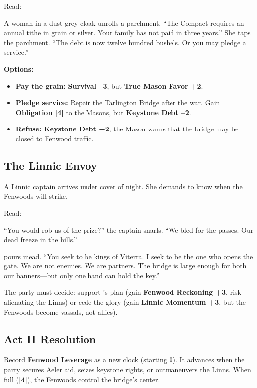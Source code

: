\documentclass[11pt,a5paper]{book}
\newcommand{\clock}[1]{\textbf{[#1]}}
\begin{document}
Read:
\begin{quoting}
A woman in a dust-grey cloak unrolls a parchment. ``The Compact requires an annual tithe in grain or silver. Your family has not paid in three years.'' She taps the parchment. ``The debt is now twelve hundred bushels. Or you may pledge a service.''
\end{quoting}

\textbf{Options:}
\begin{itemize}[leftmargin=*]
\item \textbf{Pay the grain:} \textbf{Survival --3}, but \textbf{True Mason Favor +2}.
\item \textbf{Pledge service:} Repair the Tarlington Bridge after the war. Gain \textbf{Obligation \clock{4}} to the Masons, but \textbf{Keystone Debt --2}.
\item \textbf{Refuse:} \textbf{Keystone Debt +2}; the Mason warns that the bridge may be closed to Fenwood traffic.
\end{itemize}

\subsection*{The Linnic Envoy}

A Linnic captain arrives under cover of night. She demands to know when the Fenwoods will strike.

Read:
\begin{quoting}
``You would rob us of the prize?'' the captain snarls. ``We bled for the passes. Our dead freeze in the hills.''

\aldric{} pours mead. ``You seek to be kings of Viterra. I seek to be the one who opens the gate. We are not enemies. We are partners. The bridge is large enough for both our banners---but only one hand can hold the key.''
\end{quoting}

The party must decide: support \aldric's plan (gain \textbf{Fenwood Reckoning +3}, risk alienating the Linns) or cede the glory (gain \textbf{Linnic Momentum +3}, but the Fenwoods become vassals, not allies).

\subsection*{Act II Resolution}

Record \textbf{Fenwood Leverage} as a new clock (starting 0). It advances when the party secures Aeler aid, seizes keystone rights, or outmaneuvers the Linns. When full (\clock{4}), the Fenwoods control the bridge's center.
\end{document}
